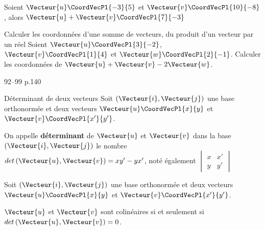 \documentclass[a4paper]{article}
\begin{document}
\begin{example}{}{}
  Soient $\Vecteur{u}\CoordVecPl{-3}{5}$  et $\Vecteur{v}\CoordVecPl{10}{-8}$, alors $\Vecteur{u}+\Vecteur{v}\CoordVecPl{7}{-3}$
\end{example}


\begin{methode*}{Calculer les coordonnées d'une somme de vecteurs, du produit d'un vecteur par un réel}{}
  Soient $\Vecteur{u}\CoordVecPl{3}{-2}$, $\Vecteur{v}\CoordVecPl{1}{4}$ et $\Vecteur{w}\CoordVecPl{2}{-1}$.
  Calculer les coordonnées de $\Vecteur{u}+\Vecteur{v}-2\Vecteur{w}$.
 
   \vspace{2cm}
 
   \hfill{}
 \end{methode*}

 \begin{exercices}{}{}
  92--99 p.140
  \end{exercices}


 \pagebreak

\begin{definition}{Déterminant de deux vecteurs}{}
Soit $\left(\Vecteur{i},\Vecteur{j}\right)$ une base orthonormée et deux vecteurs $\Vecteur{u}\CoordVecPl{x}{y}$ et $\Vecteur{v}\CoordVecPl{x'}{y'}$.

On appelle \textbf{déterminant} de $\Vecteur{u}$ et $\Vecteur{v}$ dans la base $\left(\Vecteur{i},\Vecteur{j}\right)$ le nombre $det\left(\Vecteur{u},\Vecteur{v}\right)=xy'-yx'$, noté également 
$\begin{vmatrix} 
  x & x' \\ 
  y & y' 
  \end{vmatrix} $
\end{definition}

\begin{propriete}{}{}
  Soit $\left(\Vecteur{i},\Vecteur{j}\right)$ une base orthonormée et deux vecteurs $\Vecteur{u}\CoordVecPl{x}{y}$ et $\Vecteur{v}\CoordVecPl{x'}{y'}$.

  $\Vecteur{u}$ et $\Vecteur{v}$ sont colinéaires si et seulement si $det\left(\Vecteur{u},\Vecteur{v}\right)=0$.
\end{propriete}
\end{document}
